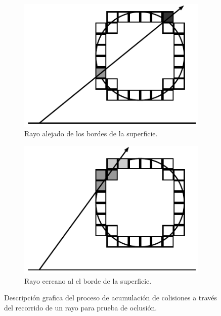 \begin{figure}[H]
	\centering
	\begin{subfigure}[t]{0.49\textwidth}
		\centering
		\captionsetup{justification=centering}
		\includegraphics[width=\linewidth]{media/shadow_tracer.pdf}
		\caption*{Rayo alejado de los bordes de la superficie.}
	\end{subfigure}%
	\hspace{0.01\textwidth}
	\begin{subfigure}[t]{0.49\textwidth}
		\centering
		\captionsetup{justification=centering}
		\includegraphics[width=\linewidth]{media/shadow_trace_corner.pdf}
		\caption*{Rayo cercano al el borde de la superficie.}
	\end{subfigure}%
	\caption{Descripción grafica del proceso de acumulación de colisiones a través del recorrido de un rayo para prueba de oclusión.}
	\label{fig:soft_voxel_shadow}
\end{figure}

